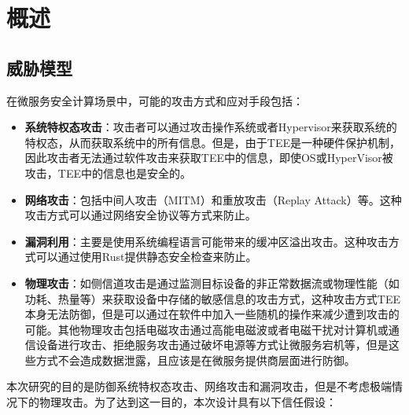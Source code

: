 \section{概述}\label{sec:overview}

\subsection{威胁模型}

在微服务安全计算场景中，可能的攻击方式和应对手段包括：

\begin{itemize}
    \item \textbf{系统特权态攻击}：攻击者可以通过攻击操作系统或者Hypervisor来获取系统的特权态，从而获取系统中的所有信息。但是，由于TEE是一种硬件保护机制，因此攻击者无法通过软件攻击来获取TEE中的信息，即使OS或HyperVisor被攻击，TEE中的信息也是安全的。
    \item \textbf{网络攻击}：包括中间人攻击（MITM）和重放攻击（Replay Attack）等。这种攻击方式可以通过网络安全协议等方式来防止。
    \item \textbf{漏洞利用}：主要是使用系统编程语言可能带来的缓冲区溢出攻击。这种攻击方式可以通过使用Rust提供静态安全检查来防止。
    \item \textbf{物理攻击}：如侧信道攻击是通过监测目标设备的非正常数据流或物理性能（如功耗、热量等）来获取设备中存储的敏感信息的攻击方式，这种攻击方式TEE本身无法防御，但是可以通过在软件中加入一些随机的操作来减少遭到攻击的可能。其他物理攻击包括电磁攻击通过高能电磁波或者电磁干扰对计算机或通信设备进行攻击、拒绝服务攻击通过破坏电源等方式让微服务宕机等，但是这些方式不会造成数据泄露，且应该是在微服务提供商层面进行防御。
\end{itemize}

本次研究的目的是防御系统特权态攻击、网络攻击和漏洞攻击，但是不考虑极端情况下的物理攻击。为了达到这一目的，本次设计具有以下信任假设：

